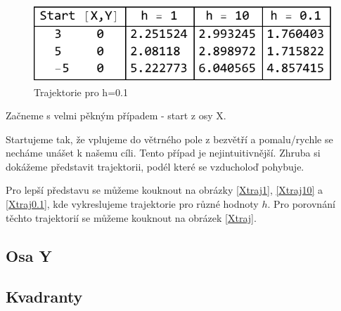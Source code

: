 \documentclass[reqno, a4paper]{amsart}
\numberwithin{equation}{section}
\begin{document}
\begin{figure}
\includegraphics[scale=0.7]{figures/OsaX - tab. beta.pdf}
\caption{Trajektorie pro h=0.1}
\label{TabX1}
\end{figure}
Začneme s velmi pěkným případem - start z osy X.

Startujeme tak, že vplujeme do větrného pole z bezvětří a pomalu/rychle se necháme unášet k našemu cíli. Tento případ je nejintuitivnější. Zhruba si dokážeme představit trajektorii, podél které se vzducholoď pohybuje.

Pro lepší představu se můžeme kouknout na obrázky \eqref{Xtraj1}, \eqref{Xtraj10} a \eqref{Xtraj0.1}, kde vykreslujeme trajektorie pro různé hodnoty $h$. Pro porovnání těchto trajektorií se můžeme kouknout na obrázek \eqref{Xtraj}. 

\subsection{Osa Y}
\label{sec: OsaY}

\subsection{Kvadranty}
\label{sec: Kvad}




























\end{document}
